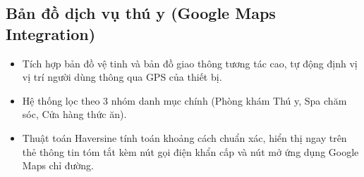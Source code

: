 \subsection{Bản đồ dịch vụ thú y (Google Maps Integration)}
\begin{itemize}
    \item Tích hợp bản đồ vệ tinh và bản đồ giao thông tương tác cao, tự động định vị vị trí người dùng thông qua GPS của thiết bị.
    \item Hệ thống lọc theo 3 nhóm danh mục chính (Phòng khám Thú y, Spa chăm sóc, Cửa hàng thức ăn).
    \item Thuật toán Haversine tính toán khoảng cách chuẩn xác, hiển thị ngay trên thẻ thông tin tóm tắt kèm nút gọi điện khẩn cấp và nút mở ứng dụng Google Maps chỉ đường.
\end{itemize}

